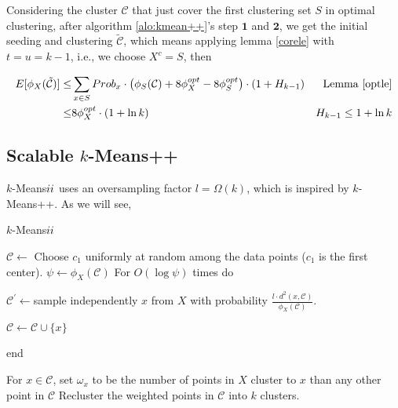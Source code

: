          Considering the cluster $\mathcal{C}$ that just cover the first clustering set $S$ in optimal clustering, after algorithm \ref{alo:kmean++}'s step $\textbf{1}$ and $\textbf{2}$, we get the initial seeding and clustering $\tilde{\mathcal{C}}$, which means applying lemma \ref{corele} with $t = u = k-1$, i.e., we choose $X^{c} = S$, then 
	
	\begin{equation}
	\begin{aligned}
	E[\phi_{X}(\tilde{\mathcal{C}})]  \leq &\sum_{x \in S} Prob_{x} \cdot\left(\phi_{S}(\mathcal{C}) + 8\phi^{opt}_{X} - 8\phi_{S}^{opt}\right)\cdot (1+H_{k-1}) &\text{Lemma \ref{optle}} \\
	\leq &8\phi^{opt}_{X}\cdot (1+\ln k) & H_{k-1} \leq 1+\ln k\\
	\end{aligned}     
	\end{equation}
         
         
         
         
         
         
         \subsection{Scalable $k$-Means++}
         \newcommand{\RNum}[1]{\uppercase\expandafter{\romannumeral #1}}
         $k$-Means$\RNum{2}$ uses an oversampling factor $l = \Omega(k)$, which is inspired by $k$-Means++. As we will see,
         	\begin{algorithm}[H]
		\begin{algorithmic}[1]
			\caption{$k$-Means$\RNum{2}$}
			\label{alo:kmean2}
			\State $\mathcal{C}\leftarrow$ Choose $c_1$ uniformly at random among the data points ($c_1$ is the first center).
			\State $\psi \leftarrow \phi_{X}(\mathcal{C})$
			 \State For $O(\log \psi)$ times do 

		$\mathcal{C}^{'} \leftarrow $sample independently $x$ from $X$ with probability $\frac{l \cdot d^{2}(x, \mathcal{C})}{\phi_{X}(\mathcal{C})}$.
		    
		    $\mathcal{C} \leftarrow \mathcal{C}\cup\{x\}$
		    
		    end
		    
		    \State For $x \in \mathcal{C}$, set $\omega_{x}$ to be the number of points in $X$ cluster to $x$ than any other point in $\mathcal{C}$
		    \State Recluster the weighted points in $\mathcal{C}$ into $k$ clusters.
		\end{algorithmic}
	\end{algorithm}
	
